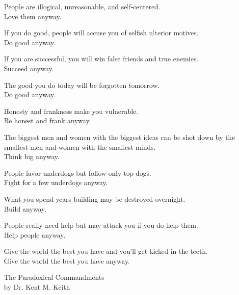 \documentclass[oneside]{article}
\begin{document}
\pagestyle{empty}
\center\sffamily{}\selectfont\Large\color{black!60!cyan}

{\huge\garamond\normalfont\color{black} People are illogical, unreasonable, and self-centered.}\\
Love them anyway.

\vfill

{\huge\garamond\normalfont\color{black} If you do good, people will accuse you of selfish ulterior
motives.}\\
Do good anyway.

\vfill

{\huge\garamond\normalfont\color{black} If you are successful, you will win false friends and true
enemies.}\\
Succeed anyway.

\vfill

{\huge\garamond\normalfont\color{black} The good you do today will be forgotten tomorrow.}\\
Do good anyway.

\vfill

{\huge\garamond\normalfont\color{black} Honesty and frankness make you vulnerable.}\\
Be honest and frank anyway.

\vfill

{\huge\garamond\normalfont\color{black} The biggest men and women with the biggest ideas can be shot down by the
smallest men and women with the smallest minds.}\\
Think big anyway.

\vfill

{\huge\garamond\normalfont\color{black} People favor underdogs but follow only top dogs.}\\
Fight for a few underdogs anyway.

\vfill

{\huge\garamond\normalfont\color{black} What you spend years building may be destroyed overnight.}\\
Build anyway.

\vfill

{\huge\garamond\normalfont\color{black} People really need help but may attack you if you do help them.}\\
Help people anyway.

\vfill

{\huge\garamond\normalfont\color{black} Give the world the best you have and you'll get kicked in the
teeth.}\\
Give the world the best you have anyway.

\vfill
\raggedright

\garamond\normalfont\color{black} The Paradoxical Commandments\\
by Dr. Kent M. Keith
\end{document}
